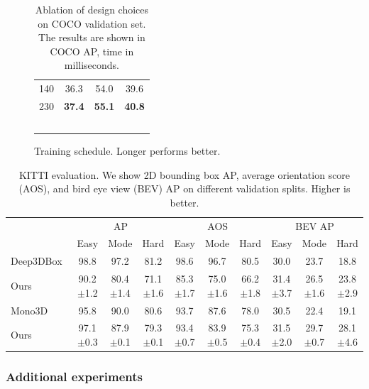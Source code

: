 \documentclass[10pt,twocolumn,letterpaper]{article}
\begin{document}
\begin{table}[t]
\begin{subfigure}[t]{0.2\linewidth}
\begin{tabular}{l c c c}
\hline
140& 36.3 & 54.0 & 39.6 \\
230& \textbf{37.4} & \textbf{55.1} & \textbf{40.8} \\
\hline
\multicolumn{4}{c}{~}\\
\end{tabular}
\caption{Training schedule. Longer performs better.}
\label{tab:design:schedule}
\end{subfigure}
\vspace{-0.5em}
\caption{Ablation of design choices on COCO validation set. The results are shown in COCO AP, time in milliseconds.}
\label{tab:design}
\vspace{-1.5em}
\setlength{\tabcolsep}{2pt}
\end{table}


\begin{table}[!hb]
\centering
\begin{tabular}{l c@{\ \ } c@{\ \ } c@{\ \ } c@{\ \ } c@{\ \ } c@{\ \ } c@{\ \ } c@{\ \ } c}
\hline
& \multicolumn{3}{c}{AP} & \multicolumn{3}{c}{AOS} & \multicolumn{3}{c}{BEV AP} \\
 & Easy & Mode & Hard & Easy & Mode & Hard & Easy & Mode & Hard \\
\hline
Deep3DBox~\cite{mousavian20173d} & 98.8 & 97.2 & 81.2 & 98.6 & 96.7 & 80.5 & 30.0 & 23.7 & 18.8 \\
Ours & 90.2$\pm$1.2 & 80.4$\pm$1.4 & 71.1$\pm$1.6 & 85.3$\pm$1.7 & 75.0$\pm$1.6 & 66.2$\pm$1.8 & 31.4$\pm$3.7 & 26.5$\pm$1.6 & 23.8$\pm$2.9 \\
\hline
Mono3D~\cite{chen2016monocular} & 95.8 & 90.0 & 80.6 & 93.7 & 87.6 & 78.0 & 30.5 & 22.4 & 19.1 \\
Ours & 97.1$\pm$0.3 & 87.9$\pm$0.1 & 79.3$\pm$0.1 & 93.4$\pm$0.7 & 83.9$\pm$0.5 & 75.3$\pm$0.4 & 31.5$\pm$2.0 & 29.7$\pm$0.7 & 28.1$\pm$4.6 \\
\hline
\end{tabular}
\vspace{-0.5em}
\caption{KITTI evaluation. We show 2D bounding box AP, average orientation score (AOS), and bird eye view (BEV) AP  on different validation splits. Higher is better.}
\label{tab:kittival}
\vspace{-0.5em}
\end{table}

\subsubsection{Additional experiments}
\end{document}
